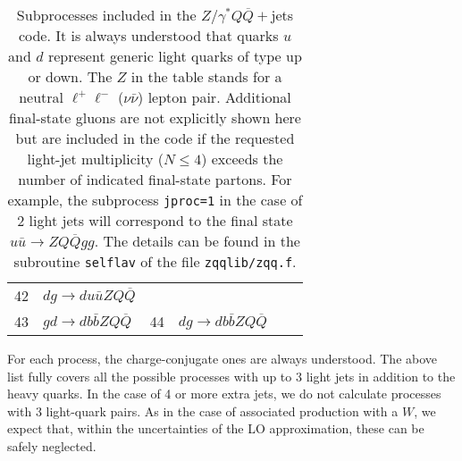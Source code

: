 \documentclass[paper]{JHEP3}
\newcommand{\ccaption}[2]{
    \begin{center}
    \parbox{0.85\textwidth}{
      \caption[#1]{\small{{#2}}}
      }
    \end{center}
    }
\def    \ubar   {\bar{u}}
\def    \bbar   {\bar{b}}
\def    \Qbar   {\overline{Q}}
\begin{document}
\begin{table}
\begin{center}
\begin{tabular}{ll|ll|ll}
42 &  $dg     \to d u \ubar Z  Q\Qbar $    \\
43 &  $gd     \to d b \bbar Z Q\Qbar  $   &
44 &  $dg     \to d b \bbar Z  Q\Qbar $   & & 
\end{tabular}
\ccaption{}{\label{tab:zqq} Subprocesses included in the $Z/\gamma^*
  Q\Qbar+$jets code. It is always understood that quarks $u$ and $d$
  represent generic light quarks of type up or down. The $Z$ in the table
  stands for a neutral $\ell^+ \ell^-$ ($\nu \bar\nu$) lepton pair.
  Additional final-state gluons are not explicitly shown here but are
  included in the code if the requested light-jet multiplicity ($N\le
  4$) exceeds the number of indicated final-state partons.  For
  example, the subprocess {\tt jproc=1} in the case of 2 light jets
  will correspond to the final state $u\ubar \to Z Q\Qbar g g$.  The
  details can be found in the subroutine {\tt selflav} of the file
  {\tt zqqlib/zqq.f}.}
\end{center}
\end{table}
For each process, the charge-conjugate ones are always understood.
The above list fully covers all the possible processes with up to 3
light jets in addition to the heavy quarks. In the case of 4 or more
extra jets, we do not calculate processes with 3 light-quark pairs. As
in the case of associated production with a $W$, we expect that,
within the uncertainties of the LO approximation, these can be safely
neglected.
\end{document}
